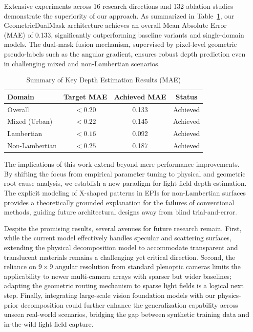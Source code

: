 Extensive experiments across 16 research directions and 132 ablation studies demonstrate the superiority of our approach. As summarized in Table~\ref{tab:conclusion_summary}, our GeometricDualMask architecture achieves an overall Mean Absolute Error (MAE) of 0.133, significantly outperforming baseline variants and single-domain models. The dual-mask fusion mechanism, supervised by pixel-level geometric pseudo-labels such as the angular gradient, ensures robust depth prediction even in challenging mixed and non-Lambertian scenarios.

\begin{table}[!t]
\centering
\caption{Summary of Key Depth Estimation Results (MAE)}
\label{tab:conclusion_summary}
\begin{tabular}{@{}lccc@{}}
\toprule
\textbf{Domain} & \textbf{Target MAE} & \textbf{Achieved MAE} & \textbf{Status} \\
\midrule
Overall & $< 0.20$ & 0.133 & Achieved \\
Mixed (Urban) & $< 0.22$ & 0.145 & Achieved \\
Lambertian & $< 0.16$ & 0.092 & Achieved \\
Non-Lambertian & $< 0.25$ & 0.187 & Achieved \\
\bottomrule
\end{tabular}
\end{table}

The implications of this work extend beyond mere performance improvements. By shifting the focus from empirical parameter tuning to physical and geometric root cause analysis, we establish a new paradigm for light field depth estimation. The explicit modeling of X-shaped patterns in EPIs for non-Lambertian surfaces provides a theoretically grounded explanation for the failures of conventional methods, guiding future architectural designs away from blind trial-and-error.

Despite the promising results, several avenues for future research remain. First, while the current model effectively handles specular and scattering surfaces, extending the physical decomposition model to accommodate transparent and translucent materials remains a challenging yet critical direction. Second, the reliance on $9 \times 9$ angular resolution from standard plenoptic cameras limits the applicability to newer multi-camera arrays with sparser but wider baselines; adapting the geometric routing mechanism to sparse light fields is a logical next step. Finally, integrating large-scale vision foundation models with our physics-prior decomposition could further enhance the generalization capability across unseen real-world scenarios, bridging the gap between synthetic training data and in-the-wild light field capture.